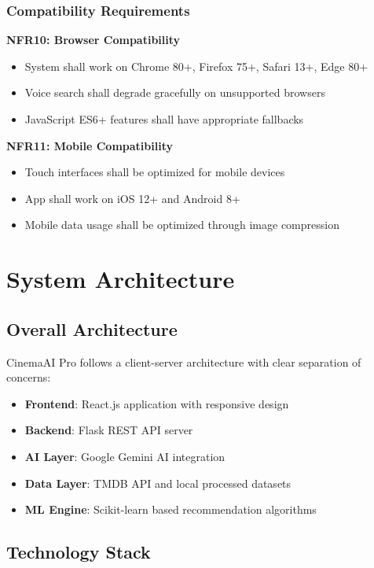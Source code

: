 \documentclass[12pt,a4paper]{article}
\begin{document}
\subsubsection{Compatibility Requirements}

\textbf{NFR10: Browser Compatibility}
\begin{itemize}
    \item System shall work on Chrome 80+, Firefox 75+, Safari 13+, Edge 80+
    \item Voice search shall degrade gracefully on unsupported browsers
    \item JavaScript ES6+ features shall have appropriate fallbacks
\end{itemize}

\textbf{NFR11: Mobile Compatibility}
\begin{itemize}
    \item Touch interfaces shall be optimized for mobile devices
    \item App shall work on iOS 12+ and Android 8+
    \item Mobile data usage shall be optimized through image compression
\end{itemize}

\section{System Architecture}

\subsection{Overall Architecture}
CinemaAI Pro follows a client-server architecture with clear separation of concerns:

\begin{itemize}
    \item \textbf{Frontend}: React.js application with responsive design
    \item \textbf{Backend}: Flask REST API server
    \item \textbf{AI Layer}: Google Gemini AI integration
    \item \textbf{Data Layer}: TMDB API and local processed datasets
    \item \textbf{ML Engine}: Scikit-learn based recommendation algorithms
\end{itemize}

\subsection{Technology Stack}
\end{document}
